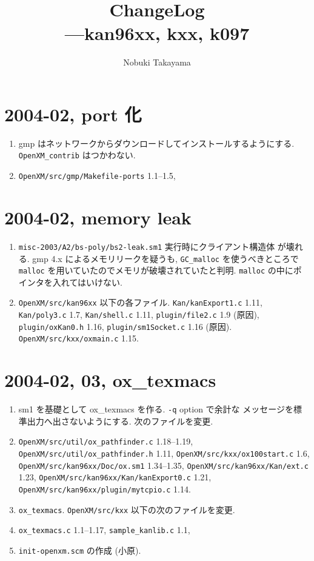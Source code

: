 \documentclass{jarticle}
\title{ChangeLog \\ ---kan96xx, kxx, k097}
\author{Nobuki Takayama}
\date{}
\begin{document}
\maketitle



\section{2004-02, port 化}

\begin{enumerate}
\item gmp はネットワークからダウンロードしてインストールするようにする.
{\tt OpenXM\_contrib} はつかわない.
\item {\tt OpenXM/src/gmp/Makefile-ports} 1.1--1.5,
\end{enumerate}

\section{2004-02,  memory leak}
\begin{enumerate}
\item {\tt misc-2003/A2/bs-poly/bs2-leak.sm1} 実行時にクライアント構造体
が壊れる.  gmp 4.x によるメモリリークを疑うも, {\tt GC\_malloc} を使うべきところで
{\tt malloc} を用いていたのでメモリが破壊されていたと判明.
{\tt malloc} の中にポインタを入れてはいけない.
\item {\tt OpenXM/src/kan96xx} 以下の各ファイル.
{\tt Kan/kanExport1.c} 1.11,
{\tt Kan/poly3.c} 1.7,
{\tt Kan/shell.c} 1.11,
{\tt plugin/file2.c} 1.9 (原因),
{\tt plugin/oxKan0.h} 1.16,
{\tt plugin/sm1Socket.c} 1.16 (原因).
{\tt OpenXM/src/kxx/oxmain.c} 1.15.
\end{enumerate}

\section{2004-02, 03, ox\_texmacs}
\begin{enumerate}
\item sm1 を基礎として ox\_texmacs を作る.  {\tt -q} option で余計な
メッセージを標準出力へ出さないようにする.  次のファイルを変更.
\item {\tt OpenXM/src/util/ox\_pathfinder.c} 1.18--1.19,
{\tt OpenXM/src/util/ox\_pathfinder.h} 1.11,
{\tt OpenXM/src/kxx/ox100start.c} 1.6,
{\tt OpenXM/src/kan96xx/Doc/ox.sm1} 1.34--1.35,
{\tt OpenXM/src/kan96xx/Kan/ext.c} 1.23,
{\tt OpenXM/src/kan96xx/Kan/kanExport0.c} 1.21,
{\tt OpenXM/src/kan96xx/plugin/mytcpio.c} 1.14.
\item {\tt ox\_texmacs}. 
 {\tt OpenXM/src/kxx} 以下の次のファイルを変更.
\item {\tt ox\_texmacs.c} 1.1--1.17,
{\tt sample\_kanlib.c} 1.1,
\item {\tt init-openxm.scm} の作成 (小原).
\end{enumerate}
\end{document}
